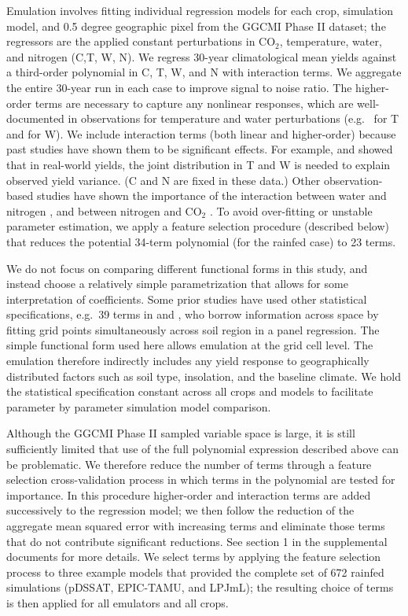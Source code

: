 \documentclass[gmd, manuscript]{copernicus} %
\begin{document}
Emulation involves fitting individual regression models for each crop, simulation model, and 0.5 degree geographic pixel from the GGCMI Phase II dataset; the regressors are the applied constant perturbations in CO$_2$, temperature, water, and nitrogen (C,T, W, N).  We regress 30-year climatological mean yields against a third-order polynomial in C, T, W, and N with interaction terms. We aggregate the entire 30-year run in each case to improve signal to noise ratio. The higher-order terms are necessary to capture any nonlinear responses, which are well-documented in observations for temperature and water perturbations (e.g.\ \citet{Schlenker2009} for T and \citet{He2016} for W). We include interaction terms (both linear and higher-order) because past studies have shown them to be significant effects. For example, \citet{Lobell2007} and \citet{Tebaldi2008} showed that in real-world yields, the joint distribution in T and W is needed to explain observed yield variance. (C and N are fixed in these data.) Other observation-based studies have shown the importance of the interaction between water and nitrogen \citep[e.g.][]{AULAKH2005}, and between nitrogen and CO$_2$ \citep{Mitsuru92, Nakamura97}. To avoid over-fitting or unstable parameter estimation, we apply a feature selection procedure (described below) that reduces the potential 34-term polynomial (for the rainfed case) to 23 terms.

We do not focus on comparing different functional forms in this study, and instead choose a relatively simple parametrization that allows for some interpretation of coefficients. Some prior studies have used other statistical specifications, e.g.\ 39 terms in \citet{BLANC2015} and \citet{BLANC2017}, who borrow information across space by fitting grid points simultaneously across soil region in a panel regression. The simple functional form used here allows emulation at the grid cell level. The emulation therefore indirectly includes any yield response to geographically distributed factors such as soil type, insolation, and the baseline climate. We hold the statistical specification constant across all crops and models to facilitate parameter by parameter simulation model comparison.

Although the GGCMI Phase II sampled variable space is large, it is still sufficiently limited that use of the full polynomial expression described above can be problematic. We therefore reduce the number of terms through a feature selection cross-validation process in which terms in the polynomial are tested for importance. In this procedure higher-order and interaction terms are added successively to the regression model; we then follow the reduction of the aggregate mean squared error with increasing terms and eliminate those terms that do not contribute significant reductions. See section 1 in the supplemental documents for more details. We select terms by applying the feature selection process to three example models that provided the complete set of 672 rainfed simulations (pDSSAT, EPIC-TAMU, and LPJmL); the resulting choice of terms is then applied for all emulators and all crops.
\end{document}
